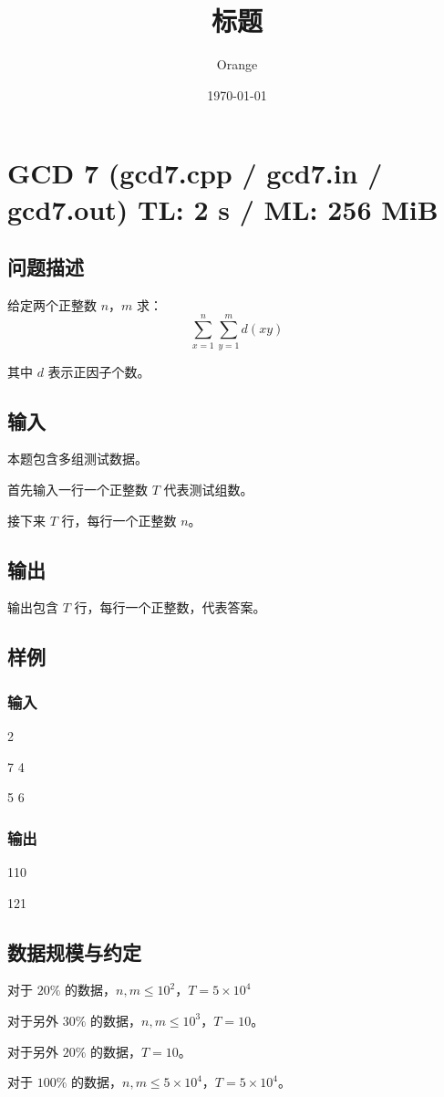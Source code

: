 \documentclass[UTF8]{article}
\title{标题}
\author{Orange}
\date{\today}
\begin{document}
	\heiti

	\section{GCD 7 \small(gcd7.cpp / gcd7.in / gcd7.out) TL: 2 s / ML: 256 MiB}
	\subsection{问题描述}
	给定两个正整数 $n$，$m$
	求：
	$$
	\sum_{x = 1}^{n} \sum_{y = 1}^{m} d(xy)
	$$

	其中 $d$ 表示正因子个数。

	\subsection{输入}
	本题包含多组测试数据。

	首先输入一行一个正整数 $T$ 代表测试组数。

	接下来 $T$ 行，每行一个正整数 $n$。

	\subsection{输出}
	输出包含 $T$ 行，每行一个正整数，代表答案。

	\subsection{样例}
	\subsubsection{输入}
	2

	7 4

	5 6

	\subsubsection{输出}
	110

	121

	\subsection{数据规模与约定}
	对于 $20\%$ 的数据，$n, m \le 10^2$，$T = 5 \times 10^4$

	对于另外 $30\%$ 的数据，$n, m \le 10^3$，$T = 10$。

	对于另外 $20\%$ 的数据，$T = 10$。

	对于 $100\%$ 的数据，$n, m \le 5 \times 10^4$，$T = 5 \times 10^4$。
\end{document}
